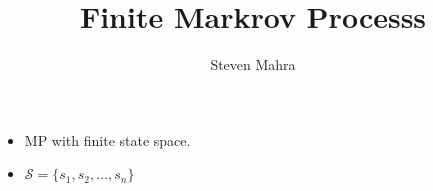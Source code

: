 \documentclass[10pt,a4paper]{article}
\begin{document}
\title{Finite Markrov Processs}
\author{Steven Mahra}
\maketitle
\begin{itemize}
\item MP with finite state space.
\item $\mathcal{S} = \{s_1,s_2,\dots,s_n\}$
\end{itemize}
\end{document}
